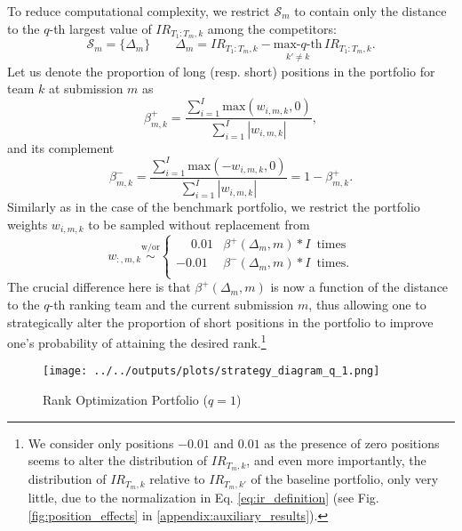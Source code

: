 \documentclass[3p,times,twocolumn]{elsarticle}
\begin{document}
To reduce computational complexity, we restrict $\mathcal{S}_{m}$ to contain only the distance to the $q$-th largest value of $IR_{T_{1}:T_{m},k}$ among the competitors:
\begin{equation}
    \mathcal{S}_m = \lbrace \Delta_{m} \rbrace \qquad \Delta_{m} = IR_{T_1:T_m,k} - \underset{k' \neq k}{\textrm{max-$q$-th}} \,IR_{T_1:T_m,k}.
\end{equation}
Let us denote the proportion of long (resp. short) positions in the portfolio for team $k$ at submission $m$ as
\begin{equation}
    \beta^{+}_{m,k} = \dfrac{\sum_{i=1}^{I}\textrm{max}(w_{i,m,k},0)}{\sum_{i=1}^{I}|w_{i,m,k}|},
\end{equation}
and its complement
\begin{equation}
    \beta^{-}_{m,k} = \dfrac{\sum_{i=1}^{I}\textrm{max}(-w_{i,m,k},0)}{\sum_{i=1}^{I}|w_{i,m,k}|} = 1- \beta^{+}_{m,k}.
\end{equation}
Similarly as in the case of the benchmark portfolio, we restrict the portfolio weights $w_{i,m,k}$ to be sampled without replacement from
\begin{equation}\label{eq:rank_opt_portfolio}
    w_{:,m,k} \overset{\mathrm{w/or}}{\sim} \begin{cases}
        \phantom{+}0.01 & \beta^{+}(\Delta_{m},m)*I\, \text{ times} \\
        -0.01  & \beta^{-}(\Delta_{m},m)*I\, \text{ times}. \\
    \end{cases}
\end{equation}
The crucial difference here is that $\beta^{+}(\Delta_{m},m)$ is now a function of the distance to the $q$-th ranking team and the current submission $m$, thus allowing one to strategically alter the proportion of short positions in the portfolio to improve one's probability of attaining the desired rank.\footnote{
    We consider only positions $-0.01$ and $0.01$ as the presence of zero positions seems to alter the distribution of $IR_{T_{m},k}$, and even more importantly, the distribution of $IR_{T_{m},k}$ relative to $IR_{T_{m},k'}$ of the baseline portfolio, only very little, due to the normalization in Eq. \ref{eq:ir_definition} (see Fig. \ref{fig:position_effects} in \ref{appendix:auxiliary_results}).
}

\begin{figure}
    \centering
    \texttt{[image: ../../outputs/plots/strategy\_diagram\_q\_1.png]}
    \caption{Rank Optimization Portfolio ($q=1$)\\
        \footnotesize
    }
    \label{fig:strategy_diagram_q_1}
\end{figure}
\end{document}
